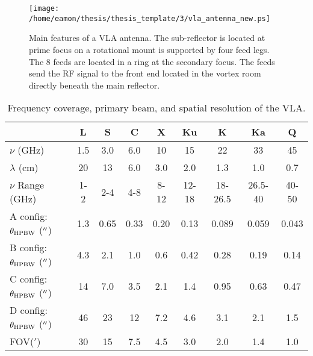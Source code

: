 \begin{figure}[hbt!]
\centering 
          \texttt{[image: /home/eamon/thesis/thesis\_template/3/vla\_antenna\_new.ps]}
\caption[Main features of a VLA antenna.]{Main features of a VLA antenna. The sub-reflector is located at prime focus on a rotational mount is supported by four feed legs. The 8 feeds are located in a ring at the secondary focus. The feeds send the RF signal to the front end located in the vortex room directly beneath the main reflector.}
\label{fig:3.5}
\end{figure}

\begin{table}
\begin{center}
\caption[Frequency coverage, primary beam, and spatial resolution of the VLA.]
{Frequency coverage, primary beam, and spatial resolution of the VLA.}
\begin{tabular}{lcccccccc}
\hline
\hline
\rule{0pt}{2.5ex} &  L& S&C&X&Ku&K&Ka&Q\\
\hline
\rule{0pt}{2.5ex}$\nu$ (GHz)& 1.5& 3.0&6.0&10&15&22&33&45\\
$\lambda$ (cm)& 20& 13&6.0&3.0&2.0&1.3&1.0&0.7\\
$\nu$ Range (GHz)& 1-2& 2-4&4-8&8-12&12-18&18-26.5&26.5-40&40-50\\
A config: $\theta_{\rm{HPBW}}$ ($^{\prime\prime}$)&  1.3& 0.65&0.33&0.20&0.13&0.089&0.059&0.043\\
B config: $\theta_{\rm{HPBW}}$ ($^{\prime\prime}$)&  4.3& 2.1&1.0&0.6&0.42&0.28&0.19&0.14\\
C config: $\theta_{\rm{HPBW}}$ ($^{\prime\prime}$)&  14& 7.0&3.5&2.1&1.4&0.95&0.63&0.47\\
D config: $\theta_{\rm{HPBW}}$ ($^{\prime\prime}$)&  46& 23&12&7.2&4.6&3.1&2.1&1.5\\
FOV($'$)& 30& 15&7.5 &4.5 &3.0&2.0&1.4&1.0\\
\hline
\end{tabular}
\label{tab:3.6}
\end{center}
\end{table}
